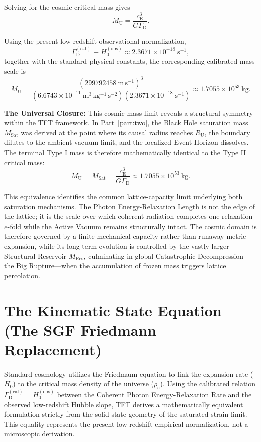 Solving for the cosmic critical mass gives
\begin{equation}
    M_{\mathrm U} = \frac{c_{\mathrm E}^{3}}{G\Gamma_{\mathrm D}}.
\end{equation}

Using the present low-redshift observational normalization,
\begin{equation}
    \Gamma_{\mathrm D}^{(\mathrm{cal})} \equiv H_{0}^{(\mathrm{obs})} \approx 2.3671\times10^{-18}\ \mathrm{s^{-1}},
\end{equation}
together with the standard physical constants, the corresponding calibrated mass scale is
\begin{equation}
    M_{\mathrm U} = \frac{ \left(299792458\ \mathrm{m\,s^{-1}}\right)^{3} }{ \left(6.6743\times10^{-11}\ \mathrm{m^{3}\,kg^{-1}\,s^{-2}}\right) \left(2.3671\times10^{-18}\ \mathrm{s^{-1}}\right) } \approx 1.7055\times10^{53}\ \mathrm{kg}.
\end{equation}

\vspace{0.5em}
\noindent\textbf{The Universal Closure:} This cosmic mass limit reveals a structural symmetry within the TFT framework. In Part~\ref{part:two}, the Black Hole saturation mass $M_{\mathrm{Sat}}$ was derived at the point where its causal radius reaches $R_{\mathrm U}$, the boundary dilutes to the ambient vacuum limit, and the localized Event Horizon dissolves. The terminal Type I mass is therefore mathematically identical to the Type II critical mass:
\begin{equation}
    M_{\mathrm U} = M_{\mathrm{Sat}} = \frac{c_{\mathrm E}^{3}}{G\Gamma_{\mathrm D}} \approx 1.7055\times10^{53}\ \mathrm{kg}.
\end{equation}

This equivalence identifies the common lattice-capacity limit underlying both saturation mechanisms. The Photon Energy-Relaxation Length is not the edge of the lattice; it is the scale over which coherent radiation completes one relaxation $e$-fold while the Active Vacuum remains structurally intact. The cosmic domain is therefore governed by a finite mechanical capacity rather than runaway metric expansion, while its long-term evolution is controlled by the vastly larger Structural Reservoir $M_{\mathrm{Res}}$, culminating in global Catastrophic Decompression---the Big Rupture---when the accumulation of frozen mass triggers lattice percolation.

\section{The Kinematic State Equation (The SGF Friedmann Replacement)}
Standard cosmology utilizes the Friedmann equation \cite{Friedmann_1922} to link the expansion rate ($H_0$) to the critical mass density of the universe ($\rho_{\mathrm{c}}$). Using the calibrated relation $\Gamma_{\mathrm{D}}^{(\mathrm{cal})} = H_0^{(\mathrm{obs})}$ between the Coherent Photon Energy-Relaxation Rate and the observed low-redshift Hubble slope, TFT derives a mathematically equivalent formulation strictly from the solid-state geometry of the saturated strain limit. This equality represents the present low-redshift empirical normalization, not a microscopic derivation.

